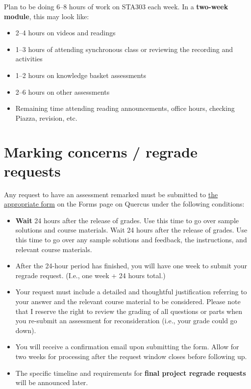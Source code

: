\documentclass[
  openany]{book}
\begin{document}
Plan to be doing 6--8 hours of work on STA303 each week. In a \textbf{two-week module}, this may look like:

\begin{itemize}
\item
  2--4 hours on videos and readings
\item
  1--3 hours of attending synchronous class or reviewing the recording and activities
\item
  1--2 hours on knowledge basket assessments
\item
  2--6 hours on other assessments
\item
  Remaining time attending reading announcements, office hours, checking Piazza, revision, etc.
\end{itemize}

\hypertarget{marking-concerns-regrade-requests}{%
\section{Marking concerns / regrade requests}\label{marking-concerns-regrade-requests}}

Any request to have an assessment remarked must be submitted to \href{https://forms.office.com/Pages/ResponsePage.aspx?id=JsKqeAMvTUuQN7RtVsVSEOKHUU3SzAJJhmOKjJhDWEpUNE02UzJaMUNQM0Q2U0RTOUlJS1JMM1dCTC4u}{the appropriate form} on the Forms page on Quercus under the following conditions:

\begin{itemize}
\item
  \textbf{Wait} 24 hours after the release of grades. Use this time to go over sample solutions and course materials. Wait 24 hours after the release of grades. Use this time to go over any sample solutions and feedback, the instructions, and relevant course materials.
\item
  After the 24-hour period has finished, you will have one week to submit your regrade request. (I.e., one week + 24 hours total.)
\item
  Your request must include a detailed and thoughtful justification referring to your answer and the relevant course material to be considered. Please note that I reserve the right to review the grading of all questions or parts when you re-submit an assessment for reconsideration (i.e., your grade could go down).
\item
  You will receive a confirmation email upon submitting the form. Allow for two weeks for processing after the request window closes before following up.
\item
  The specific timeline and requirements for \textbf{final project regrade requests} will be announced later.
\end{itemize}
\end{document}
